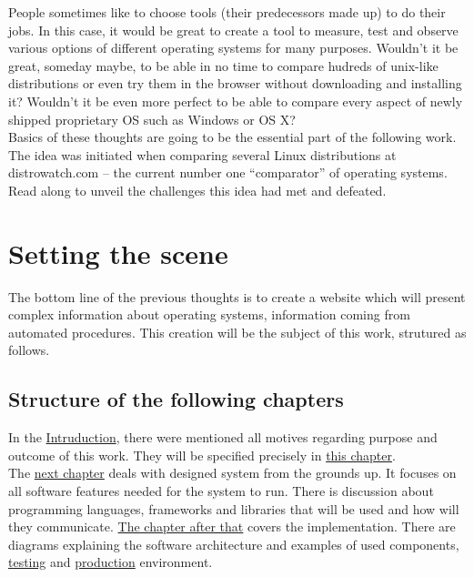 \documentclass[thesis=B,english]{FITthesis}[2013/04/26]
\begin{document}
\begin{introduction}
People sometimes like to choose tools (their predecessors made up) to do their jobs. In this case, it would be great to create a tool to measure, test and observe various options of different operating systems for many purposes. Wouldn’t it be great, someday maybe, to be able in no time to compare hudreds of unix-like distributions or even try them in the browser without downloading and installing it? Wouldn’t it be even more perfect to be able to compare every aspect of newly shipped proprietary OS such as Windows or OS X? \\

Basics of these thoughts are going to be the essential part of the following work. The idea was initiated when comparing several Linux distributions at distrowatch.com -- the current number one ``comparator'' of operating systems. Read along to unveil the challenges this idea had met and defeated.
\end{introduction}

\chapter{Setting the scene}
\label{chapter:setting_the_scene}

The bottom line of the previous thoughts is to create a website which will present complex information about operating systems, information coming from automated procedures. This creation will be the subject of this work, strutured as follows.

\section{Structure of the following chapters}

In the \hyperref[section:introduction]{Intruduction}, there were mentioned all motives regarding purpose and outcome of this work. They will be specified precisely in \hyperref[chapter:setting_the_scene]{this chapter}. \\

The \hyperref[chapter:analysis_and_design]{next chapter} deals with designed system from the grounds up. It focuses on all software features needed for the system to run. There is discussion about programming languages, frameworks and libraries that will be used and how will they communicate. \hyperref[chapter:implementation]{The chapter after that} covers the implementation. There are diagrams explaining the software architecture and examples of used components, \hyperref[section:testing]{testing} and \hyperref[chapter:production]{production} environment. \\
\end{document}
